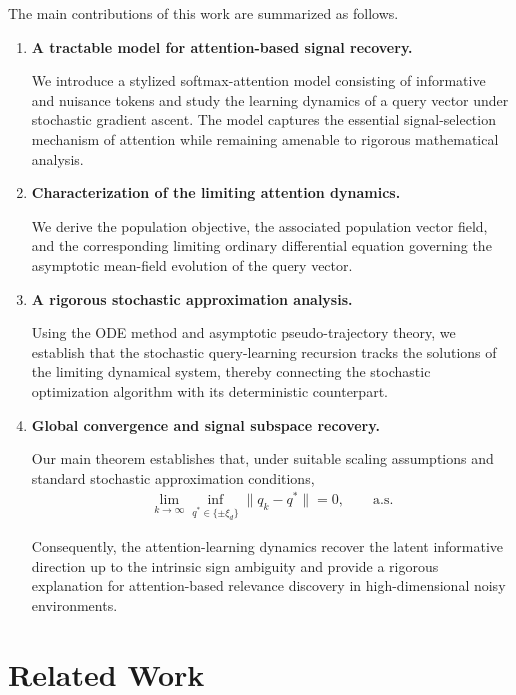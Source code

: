 \documentclass[11pt,a4paper]{article}
\theoremstyle{definition}
\begin{document}
The main contributions of this work are summarized as follows.

\begin{enumerate}

\item \textbf{A tractable model for attention-based signal recovery.}

We introduce a stylized softmax-attention model consisting of informative and nuisance tokens and study the learning dynamics of a query vector under stochastic gradient ascent. The model captures the essential signal-selection mechanism of attention while remaining amenable to rigorous mathematical analysis.

\item \textbf{Characterization of the limiting attention dynamics.}

We derive the population objective, the associated population vector field, and the corresponding limiting ordinary differential equation governing the asymptotic mean-field evolution of the query vector.

\item \textbf{A rigorous stochastic approximation analysis.}

Using the ODE method and asymptotic pseudo-trajectory theory, we establish that the stochastic query-learning recursion tracks the solutions of the limiting dynamical system, thereby connecting the stochastic optimization algorithm with its deterministic counterpart.

\item \textbf{Global convergence and signal subspace recovery.}

Our main theorem establishes that, under suitable scaling assumptions and standard stochastic approximation conditions,
\begin{align}
\lim_{k\to\infty}
\inf_{q^*\in\{\pm\xi_d\}}
\|q_k-q^*\|
=
0,
\qquad \mathrm{a.s.}
\end{align}

Consequently, the attention-learning dynamics recover the latent informative direction up to the intrinsic sign ambiguity and provide a rigorous explanation for attention-based relevance discovery in high-dimensional noisy environments.

\end{enumerate}


\section{Related Work}
\end{document}
